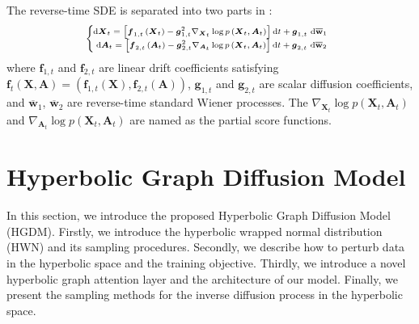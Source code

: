 \documentclass[letterpaper]{article} %
\begin{document}
The reverse-time SDE is separated into two parts in \cite{jo2022score}:
\begin{equation}
\begin{scriptsize}{
\left\{\hspace{-0.2cm}\begin{array}{l}
\mathrm{d} \boldsymbol{X}_{t}=\left[\boldsymbol{f}_{1, t}\left(\boldsymbol{X}_{t}\right)-\boldsymbol{g}_{1, t}^{2} \nabla_{\boldsymbol{X}_{t}} \log p\left(\boldsymbol{X}_{t}, \boldsymbol{A}_{t}\right)\right] \mathrm{d}t+\boldsymbol{g}_{1, t} \mathrm{~d} \overline{\mathbf{w}}_{1} \\
\mathrm{~d} \boldsymbol{A}_{t}=\left[\boldsymbol{f}_{2, t}\left(\boldsymbol{A}_{t}\right)-\boldsymbol{g}_{2, t}^{2} \nabla_{\boldsymbol{A}_{t}} \log p\left(\boldsymbol{X}_{t}, \boldsymbol{A}_{t}\right)\right] \mathrm{d}t+\boldsymbol{g}_{2, t} \mathrm{~d} \overline{\mathbf{w}}_{2}
\end{array}\right.
}\end{scriptsize}
\end{equation}
where $\boldsymbol{f}_{1,t}$ and $\boldsymbol{f}_{2,t}$ are linear drift coefficients
satisfying $\boldsymbol{f}_{t}(\boldsymbol{X}, \boldsymbol{A})=\left(\boldsymbol{f}_{1, t}(\boldsymbol{X}), \boldsymbol{f}_{2, t}(\boldsymbol{A})\right)$,
$\boldsymbol{g}_{1,t}$ and $\boldsymbol{g}_{2,t}$ are scalar diffusion coefficients, and  $\overline{\mathbf{w}}_{1}$,  $\overline{\mathbf{w}}_{2}$ are reverse-time standard Wiener processes. The $\nabla_{\boldsymbol{X}_{t}} \log p\left(\boldsymbol{X}_{t}, \boldsymbol{A}_{t}\right)$ and $\nabla_{\boldsymbol{A}_{t}} \log p\left(\boldsymbol{X}_{t}, \boldsymbol{A}_{t}\right)$ are
named as the partial score functions.

\section{Hyperbolic Graph Diffusion Model}
In this section, we introduce the proposed Hyperbolic Graph Diffusion Model (HGDM).
Firstly, we introduce the hyperbolic wrapped normal distribution (HWN) and its sampling procedures.
Secondly, we describe how to perturb data in the hyperbolic space and the training objective.
Thirdly, we introduce a novel hyperbolic graph attention layer and the architecture of our model.
Finally, we present the sampling methods for the inverse diffusion process in the hyperbolic space.
\end{document}
